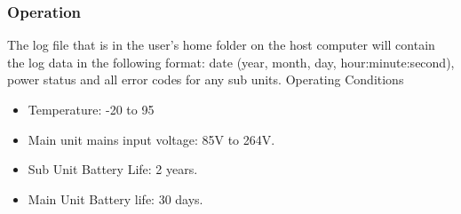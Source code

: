 \subsubsection{Operation}
The log file that is in the user's home folder on the host computer will contain the log data in the following format: date (year, month, day, hour:minute:second), power status and all error codes for any sub units.
\large{Operating Conditions}
\normalsize
\begin{itemize}
  \item Temperature: -20\si{\C} to 95\si{\C}
  \item Main unit mains input voltage: 85\si{\V} to 264\si{\V}.
  \item Sub Unit Battery Life: 2 years.
  \item Main Unit Battery life: 30 days.
\end{itemize}
